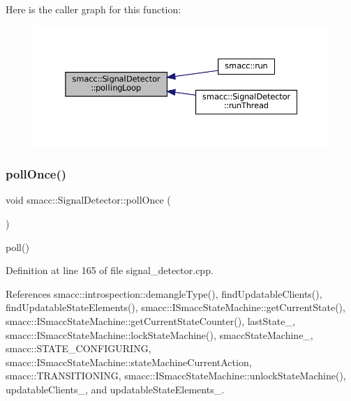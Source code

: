 Here is the caller graph for this function\+:
\nopagebreak
\begin{figure}[H]
\begin{center}
\leavevmode
\includegraphics[width=350pt]{classsmacc_1_1SignalDetector_a2665e66cdae9f6533c64bbcecf3fa199_icgraph}
\end{center}
\end{figure}
\mbox{\label{classsmacc_1_1SignalDetector_a9a116479e23259f3a5d5d4a47278afd5}} 
\subsubsection{\texorpdfstring{poll\+Once()}{pollOnce()}}
{\footnotesize\ttfamily void smacc\+::\+Signal\+Detector\+::poll\+Once (\begin{DoxyParamCaption}{ }\end{DoxyParamCaption})}

poll() 

Definition at line 165 of file signal\+\_\+detector.\+cpp.



References smacc\+::introspection\+::demangle\+Type(), find\+Updatable\+Clients(), find\+Updatable\+State\+Elements(), smacc\+::\+I\+Smacc\+State\+Machine\+::get\+Current\+State(), smacc\+::\+I\+Smacc\+State\+Machine\+::get\+Current\+State\+Counter(), last\+State\+\_\+, smacc\+::\+I\+Smacc\+State\+Machine\+::lock\+State\+Machine(), smacc\+State\+Machine\+\_\+, smacc\+::\+S\+T\+A\+T\+E\+\_\+\+C\+O\+N\+F\+I\+G\+U\+R\+I\+NG, smacc\+::\+I\+Smacc\+State\+Machine\+::state\+Machine\+Current\+Action, smacc\+::\+T\+R\+A\+N\+S\+I\+T\+I\+O\+N\+I\+NG, smacc\+::\+I\+Smacc\+State\+Machine\+::unlock\+State\+Machine(), updatable\+Clients\+\_\+, and updatable\+State\+Elements\+\_\+.



